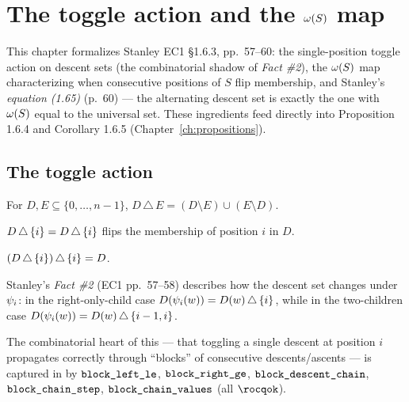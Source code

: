 \chapter{The toggle action and the $\omega(S)$ map}
\label{ch:omega}

This chapter formalizes Stanley EC1 \S1.6.3, pp.~57--60: the
single-position toggle action on descent sets (the combinatorial
shadow of \emph{Fact \#2}), the $\omega(S)$ map characterizing
when consecutive positions of $S$ flip membership, and Stanley's
\emph{equation (1.65)} (p.~60) — the alternating descent set is
exactly the one with $\omega(S)$ equal to the universal set.
These ingredients feed directly into Proposition 1.6.4 and Corollary
1.6.5 (Chapter~\ref{ch:propositions}).

\section{The toggle action}

\begin{definition}
  \label{def:sym_diff}
  \rocqok
  For $D, E \subseteq \{0, \dots, n-1\}$,
  $D \,\triangle\, E = (D \setminus E) \cup (E \setminus D)$.
\end{definition}

\begin{definition}
  \label{def:toggle_at}
  \rocqok
  $D\,\triangle\,\{i\} = D \,\triangle\, \{i\}$ flips the membership of
  position $i$ in $D$.
\end{definition}

\begin{lemma}
  \label{lem:toggle_atK}
  \rocqok
  $(D\,\triangle\,\{i\})\,\triangle\,\{i\} = D$.
\end{lemma}

\begin{remark}
  \label{rem:fact2}
  Stanley's \emph{Fact \#2} (EC1 pp.~57--58) describes how the descent
  set changes under $\psi_{i}$: in the right-only-child case
  $D(\psi_{i}(w)) = D(w) \,\triangle\, \{i\}$, while in
  the two-children case
  $D(\psi_{i}(w)) = D(w) \,\triangle\, \{i-1, i\}$.

  The combinatorial heart of this — that toggling a single descent at
  position $i$ propagates correctly through ``blocks'' of consecutive
  descents/ascents — is captured in
   by
  $\texttt{block\_left\_le}$, $\texttt{block\_right\_ge}$,
  $\texttt{block\_descent\_chain}$, $\texttt{block\_chain\_step}$,
  $\texttt{block\_chain\_values}$ (all $\rocqok$).
\end{remark}

